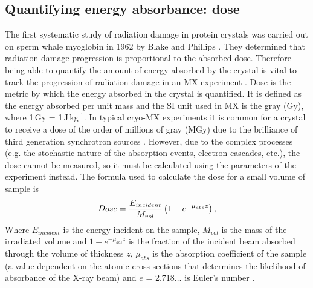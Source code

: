     \subsection{Quantifying energy absorbance: dose}
    \label{sub:Quantifying energy absorbance: Dose}
        The first systematic study of radiation damage in protein crystals was carried out on sperm whale myoglobin in 1962 by Blake and Phillips \cite{blake1962}.
        They determined that radiation damage progression is proportional to the absorbed dose.
        Therefore being able to quantify the amount of energy absorbed by the crystal is vital to track the progression of radiation damage in an MX experiment \cite{blake1962,holton2009}.
        Dose is the metric by which the energy absorbed in the crystal is quantified.
        It is defined as the energy absorbed per unit mass and the SI unit used in MX is the gray (Gy), where 1\,Gy = 1\,J\,kg$^{\text{-1}}$.
        In typical cryo-MX experiments it is common for a crystal to receive a dose of the order of millions of gray (MGy) \cite{garman2010} due to the brilliance of third generation synchrotron sources \cite{mitchell1999}.
        However, due to the complex processes (e.g. the stochastic nature of the absorption events, electron cascades, etc.), the dose cannot be measured, so it must be calculated using the parameters of the experiment instead.
        The formula used to calculate the dose for a small volume of sample is
        \begin{equation}
            Dose = \frac{E_{incident}}{M_{vol}} \left(1- e^{-\mu_{abs}z}\right),
            \label{eq:Dose Calculation 1D}
        \end{equation}
        Where $E_{incident}$ is the energy incident on the sample, $M_{vol}$ is the mass of the irradiated volume and $1- e^{-\mu_{abs}z}$ is the fraction of the incident beam absorbed through the volume of thickness $z$, $\mu_{abs}$ is the absorption coefficient of the sample (a value dependent on the atomic cross sections that determines the likelihood of absorbance of the X-ray beam) and $e$ = 2.718$\ldots$ is Euler's number \cite{zeldin2013thesis}.

